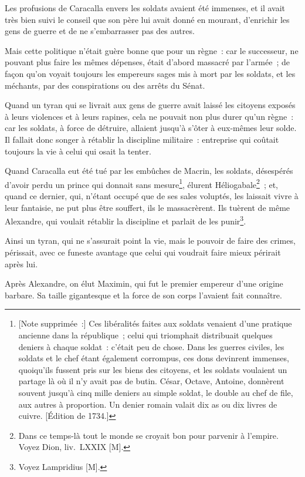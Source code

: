 \documentclass[french,twoside]{book} %
\begin{document}
Les profusions de Caracalla envers les soldats avaient été immenses, et il avait très bien suivi le conseil que son père lui avait donné en mourant, d’enrichir les gens de guerre et de ne s’embarrasser pas des autres.\par
Mais cette politique n’était guère bonne que pour un règne : car le successeur, ne pouvant plus faire les mêmes dépenses, était d’abord massacré par l’armée ; de façon qu’on voyait toujours les empereurs sages mis à mort par les soldats, et les méchants, par des conspirations ou des arrêts du Sénat.\par
Quand un tyran qui se livrait aux gens de guerre avait laissé les citoyens exposés à leurs violences et à leurs rapines, cela ne pouvait non plus durer qu’un règne : car les soldats, à force de détruire, allaient jusqu’à s’ôter à eux-mêmes leur solde. Il fallait donc songer à rétablir la discipline militaire : entreprise qui coûtait toujours la vie à celui qui osait la tenter.\par
Quand Caracalla eut été tué par les embûches de Macrin, les soldats, désespérés d’avoir perdu un prince qui donnait sans mesure\footnote{[Note supprimée :] Ces libéralités faites aux soldats venaient d’une pratique ancienne dans la république ; celui qui triomphait distribuait quelques deniers à chaque soldat : c’était peu de chose. Dans les guerres civiles, les soldats et le chef étant également corrompus, ces dons devinrent immenses, quoiqu’ils fussent pris sur les biens des citoyens, et les soldats voulaient un partage là où il n’y avait pas de butin. César, Octave, Antoine, donnèrent souvent jusqu’à cinq mille deniers au simple soldat, le double au chef de file, aux autres à proportion. Un denier romain valait dix as ou dix livres de cuivre. [Édition de 1734.]}, élurent Héliogabale\footnote{Dans ce temps-là tout le monde se croyait bon pour parvenir à l’empire. Voyez Dion, liv. LXXIX [M].} ; et, quand ce dernier, qui, n’étant occupé que de ses sales voluptés, les laissait vivre à leur fantaisie, ne put plus être souffert, ils le massacrèrent. Ils tuèrent de même Alexandre, qui voulait rétablir la discipline et parlait de les punir\footnote{Voyez Lampridius [M].}.\par
Ainsi un tyran, qui ne s’assurait point la vie, mais le pouvoir de faire des crimes, périssait, avec ce funeste avantage que celui qui voudrait faire mieux périrait après lui.\par
Après Alexandre, on élut Maximin, qui fut le premier empereur d’une origine barbare. Sa taille gigantesque et la force de son corps l’avaient fait connaître.\par
\end{document}
